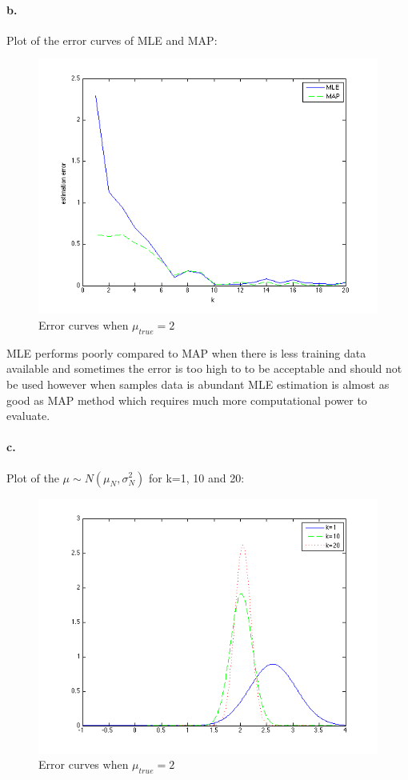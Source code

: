 \documentclass[a4paper]{article}
\begin{document}
\paragraph{b.} Plot of the error curves of MLE and MAP:\\
\begin{figure}[H]
  \centering
    \includegraphics[scale=.47]{images/4_esti_error.png}
  \caption{Error curves when $\mu_{true} = 2$}
\end{figure}

MLE performs poorly compared to MAP when there is less training data available and sometimes the error is too high to to be acceptable and should not be used however when samples data is abundant MLE estimation is almost as good as MAP method which requires much more computational power to evaluate.

\paragraph{c.} Plot of the $\mu \sim N(\mu_{N}, \sigma^{2}_{N})$ for k=1, 10 and 20:\\
\begin{figure}[H]
  \centering
    \includegraphics[scale=.47]{images/4_posterior_pdf.png}
  \caption{Error curves when $\mu_{true} = 2$}
\end{figure}
\end{document}
